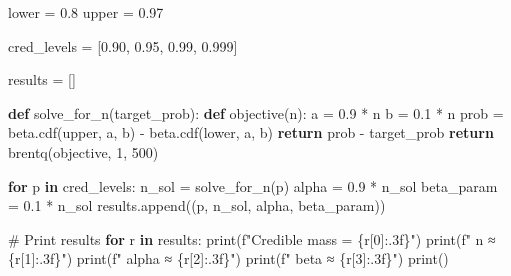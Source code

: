 \documentclass[
  letterpaper,
  DIV=11,
  numbers=noendperiod]{scrartcl}
\newenvironment{Shaded}{\begin{snugshade}}{\end{snugshade}}
\newcommand{\BuiltInTok}[1]{\textcolor[rgb]{0.00,0.23,0.31}{#1}}
\newcommand{\CommentTok}[1]{\textcolor[rgb]{0.37,0.37,0.37}{#1}}
\newcommand{\ControlFlowTok}[1]{\textcolor[rgb]{0.00,0.23,0.31}{\textbf{#1}}}
\newcommand{\DecValTok}[1]{\textcolor[rgb]{0.68,0.00,0.00}{#1}}
\newcommand{\FloatTok}[1]{\textcolor[rgb]{0.68,0.00,0.00}{#1}}
\newcommand{\KeywordTok}[1]{\textcolor[rgb]{0.00,0.23,0.31}{\textbf{#1}}}
\newcommand{\NormalTok}[1]{\textcolor[rgb]{0.00,0.23,0.31}{#1}}
\newcommand{\OperatorTok}[1]{\textcolor[rgb]{0.37,0.37,0.37}{#1}}
\newcommand{\SpecialCharTok}[1]{\textcolor[rgb]{0.37,0.37,0.37}{#1}}
\newcommand{\SpecialStringTok}[1]{\textcolor[rgb]{0.13,0.47,0.30}{#1}}
\begin{document}
\begin{Shaded}
\begin{Highlighting}[]
\NormalTok{lower }\OperatorTok{=} \FloatTok{0.8}
\NormalTok{upper }\OperatorTok{=} \FloatTok{0.97}

\NormalTok{cred\_levels }\OperatorTok{=}\NormalTok{ [}\FloatTok{0.90}\NormalTok{, }\FloatTok{0.95}\NormalTok{, }\FloatTok{0.99}\NormalTok{, }\FloatTok{0.999}\NormalTok{]}

\NormalTok{results }\OperatorTok{=}\NormalTok{ []}

\KeywordTok{def}\NormalTok{ solve\_for\_n(target\_prob):}
    \KeywordTok{def}\NormalTok{ objective(n):}
\NormalTok{        a }\OperatorTok{=} \FloatTok{0.9} \OperatorTok{*}\NormalTok{ n}
\NormalTok{        b }\OperatorTok{=} \FloatTok{0.1} \OperatorTok{*}\NormalTok{ n}
\NormalTok{        prob }\OperatorTok{=}\NormalTok{ beta.cdf(upper, a, b) }\OperatorTok{{-}}\NormalTok{ beta.cdf(lower, a, b)}
        \ControlFlowTok{return}\NormalTok{ prob }\OperatorTok{{-}}\NormalTok{ target\_prob}
    \ControlFlowTok{return}\NormalTok{ brentq(objective, }\DecValTok{1}\NormalTok{, }\DecValTok{500}\NormalTok{)}

\ControlFlowTok{for}\NormalTok{ p }\KeywordTok{in}\NormalTok{ cred\_levels:}
\NormalTok{    n\_sol }\OperatorTok{=}\NormalTok{ solve\_for\_n(p)}
\NormalTok{    alpha }\OperatorTok{=} \FloatTok{0.9} \OperatorTok{*}\NormalTok{ n\_sol}
\NormalTok{    beta\_param }\OperatorTok{=} \FloatTok{0.1} \OperatorTok{*}\NormalTok{ n\_sol}
\NormalTok{    results.append((p, n\_sol, alpha, beta\_param))}

\CommentTok{\# Print results}
\ControlFlowTok{for}\NormalTok{ r }\KeywordTok{in}\NormalTok{ results:}
    \BuiltInTok{print}\NormalTok{(}\SpecialStringTok{f"Credible mass = }\SpecialCharTok{\{}\NormalTok{r[}\DecValTok{0}\NormalTok{]}\SpecialCharTok{:.3f\}}\SpecialStringTok{"}\NormalTok{)}
    \BuiltInTok{print}\NormalTok{(}\SpecialStringTok{f"  n ≈ }\SpecialCharTok{\{}\NormalTok{r[}\DecValTok{1}\NormalTok{]}\SpecialCharTok{:.3f\}}\SpecialStringTok{"}\NormalTok{)}
    \BuiltInTok{print}\NormalTok{(}\SpecialStringTok{f"  alpha ≈ }\SpecialCharTok{\{}\NormalTok{r[}\DecValTok{2}\NormalTok{]}\SpecialCharTok{:.3f\}}\SpecialStringTok{"}\NormalTok{)}
    \BuiltInTok{print}\NormalTok{(}\SpecialStringTok{f"  beta  ≈ }\SpecialCharTok{\{}\NormalTok{r[}\DecValTok{3}\NormalTok{]}\SpecialCharTok{:.3f\}}\SpecialStringTok{"}\NormalTok{)}
    \BuiltInTok{print}\NormalTok{()}
\end{Highlighting}
\end{Shaded}
\end{document}
